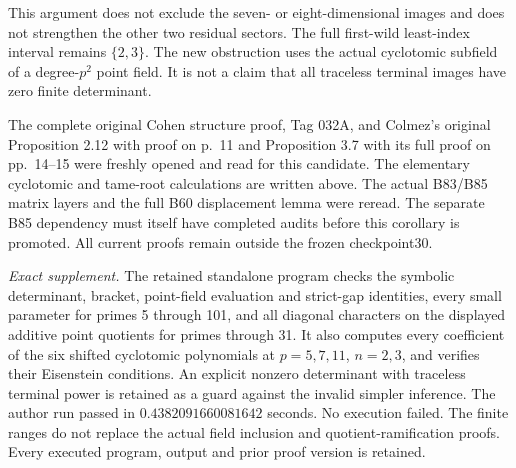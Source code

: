 \begin{remark}
\label{rem:B-RD86-scope}
This argument does not exclude the seven- or
eight-dimensional images and does not strengthen the
other two residual sectors. The full first-wild
least-index interval remains \(\{2,3\}\).
The new obstruction uses the actual cyclotomic
subfield of a degree-\(p^2\) point field. It is not a
claim that all traceless terminal images have zero
finite determinant.

The complete original Cohen structure proof, Tag 032A,
and Colmez's original Proposition 2.12 with proof on
p.~11 and Proposition 3.7 with its full proof on
pp.~14--15 were freshly opened and read for this
candidate. The elementary cyclotomic and tame-root
calculations are written above. The actual B83/B85
matrix layers and the full B60 displacement lemma
were reread. The separate B85 dependency must itself
have completed audits before this corollary is
promoted. All current proofs remain outside the
frozen checkpoint30.

\smallskip
\noindent\emph{Exact supplement.}
The retained standalone program
checks the symbolic determinant, bracket, point-field
evaluation and strict-gap identities, every small
parameter for primes 5 through 101, and all diagonal
characters on the displayed additive point quotients
for primes through 31. It also computes every
coefficient of the six shifted cyclotomic polynomials
at \(p=5,7,11\), \(n=2,3\), and verifies their
Eisenstein conditions. An explicit nonzero determinant
with traceless terminal power is retained as a guard
against the invalid simpler inference. The author run
passed in \(0.4382091660081642\) seconds. No execution failed.
The finite ranges do not replace the actual field
inclusion and quotient-ramification proofs. Every
executed program, output and prior proof version is
retained.
\end{remark}
